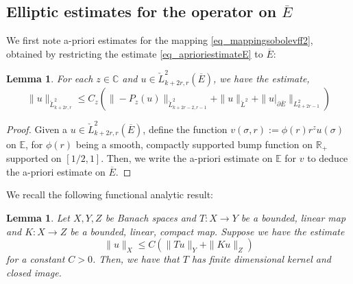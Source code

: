\documentclass[10pt, a4paper]{article}
\theoremstyle{plain}%
\newtheorem{lem}[theorem]{Lemma}
\theoremstyle{definition}
\numberwithin{figure}{section}
\numberwithin{equation}{section}
\newcommand{\bR}{\mathbb{R}}
\newcommand{\bC}{\mathbb{C}}
\newcommand{\bE}{\mathbb{E}}
\newcommand{\pa}{\partial}
\newcommand{\oE}{{\overline{E}}}
\newcommand{\chL}{\check{L}}
\begin{document}
\subsection{Elliptic estimates for the operator on $\oE$}
We first note a-priori estimates for the mapping \eqref{eq_mappingsobolevff2}, obtained by restricting the estimate \eqref{eq_aprioriestimateE} to $\oE$:
\begin{lem}
	For each $z\in \bC$ and $u\in \chL^2_{k+2r,r}(\oE)$, we have the estimate, 
	\begin{equation}\label{eq_interiorestimateff}
		\|u\|_{\chL^2_{k+2r,r}} \leq C_{z}(\|-P_{z}(u)\|_{\chL^2_{k+2r-2,r-1}} + \|u\|_{\chL^2}+\|u|_{\pa \oE}\|_{L^2_{k+2r-1}})
	\end{equation}
\end{lem}
\begin{proof}
	Given a $u\in \chL^2_{k+2r,r}(\oE)$, define the function $v(\sigma,r):= \phi(r)r^zu(\sigma)$ on $\bE$, for $\phi(r)$ being a smooth, compactly supported bump function on $\bR_+$ supported on $[1/2,1]$. Then, we write the a-priori estimate on $\bE$ for $v$ to deduce the a-priori estimate on $\oE$.
\end{proof}
We recall the following functional analytic result: 
\begin{lem}\label{lem_funcana}
	Let $X,Y,Z$ be Banach spaces and $T: X\rightarrow Y$ be a bounded, linear map and $K: X \rightarrow Z$ be a bounded, linear, compact map. Suppose we have the estimate \[
	\|u\|_X \leq C(\|Tu\|_Y + \|Ku\|_Z)
	\]
	for a constant $C>0$. Then, we have that $T$ has finite dimensional kernel and closed image.
\end{lem}
\end{document}
